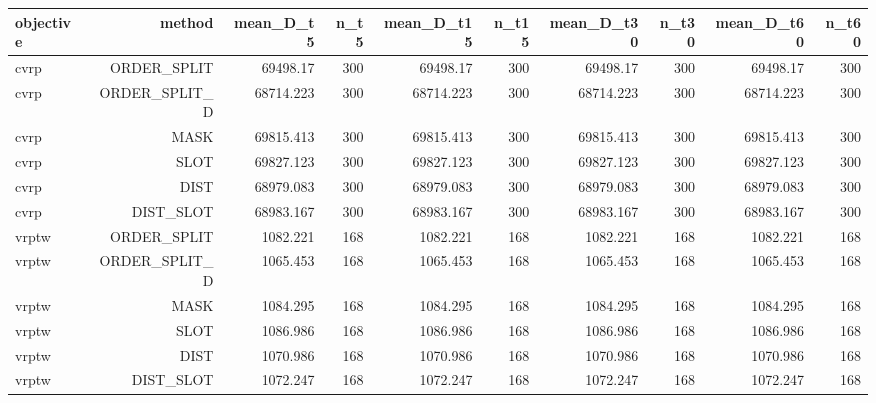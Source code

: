 \begin{tabular}{lrrrrrrrrr}
\toprule
objective & method & mean\_D\_t5 & n\_t5 & mean\_D\_t15 & n\_t15 & mean\_D\_t30 & n\_t30 & mean\_D\_t60 & n\_t60 \\
\midrule
cvrp & ORDER\_SPLIT & 69498.17 & 300 & 69498.17 & 300 & 69498.17 & 300 & 69498.17 & 300 \\
cvrp & ORDER\_SPLIT\_D & 68714.223 & 300 & 68714.223 & 300 & 68714.223 & 300 & 68714.223 & 300 \\
cvrp & MASK & 69815.413 & 300 & 69815.413 & 300 & 69815.413 & 300 & 69815.413 & 300 \\
cvrp & SLOT & 69827.123 & 300 & 69827.123 & 300 & 69827.123 & 300 & 69827.123 & 300 \\
cvrp & DIST & 68979.083 & 300 & 68979.083 & 300 & 68979.083 & 300 & 68979.083 & 300 \\
cvrp & DIST\_SLOT & 68983.167 & 300 & 68983.167 & 300 & 68983.167 & 300 & 68983.167 & 300 \\
vrptw & ORDER\_SPLIT & 1082.221 & 168 & 1082.221 & 168 & 1082.221 & 168 & 1082.221 & 168 \\
vrptw & ORDER\_SPLIT\_D & 1065.453 & 168 & 1065.453 & 168 & 1065.453 & 168 & 1065.453 & 168 \\
vrptw & MASK & 1084.295 & 168 & 1084.295 & 168 & 1084.295 & 168 & 1084.295 & 168 \\
vrptw & SLOT & 1086.986 & 168 & 1086.986 & 168 & 1086.986 & 168 & 1086.986 & 168 \\
vrptw & DIST & 1070.986 & 168 & 1070.986 & 168 & 1070.986 & 168 & 1070.986 & 168 \\
vrptw & DIST\_SLOT & 1072.247 & 168 & 1072.247 & 168 & 1072.247 & 168 & 1072.247 & 168 \\
\bottomrule
\end{tabular}
